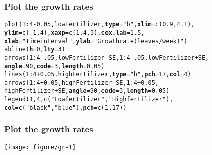 \documentclass[color=usenames,dvipsnames]{beamer}\usepackage[]{graphicx}\usepackage[]{color}
\makeatletter
\newcommand{\hlnum}[1]{\textcolor[rgb]{0.69,0.494,0}{#1}}%
\newcommand{\hlstr}[1]{\textcolor[rgb]{0.749,0.012,0.012}{#1}}%
\newcommand{\hlopt}[1]{\textcolor[rgb]{0,0,0}{#1}}%
\newcommand{\hlstd}[1]{\textcolor[rgb]{0,0,0}{#1}}%
\newcommand{\hlkwc}[1]{\textcolor[rgb]{0,0,0}{\textbf{#1}}}%
\newcommand{\hlkwd}[1]{\textcolor[rgb]{0.004,0.004,0.506}{#1}}%
\newenvironment{kframe}{%
 \def\at@end@of@kframe{}%
 \ifinner\ifhmode%
  \def\at@end@of@kframe{\end{minipage}}%
  \begin{minipage}{\columnwidth}%
 \fi\fi%
 \def\FrameCommand##1{\hskip\@totalleftmargin \hskip-\fboxsep
 \colorbox{shadecolor}{##1}\hskip-\fboxsep
     \hskip-\linewidth \hskip-\@totalleftmargin \hskip\columnwidth}%
 \MakeFramed {\advance\hsize-\width
   \@totalleftmargin\z@ \linewidth\hsize
   \@setminipage}}%
 {\par\unskip\endMakeFramed%
 \at@end@of@kframe}
\newenvironment{knitrout}{}{} %
\makeatother
\begin{document}
\begin{frame}[fragile]
  \frametitle{Plot the growth rates}
\begin{knitrout}\small
{}\color{fgcolor}\begin{kframe}
\begin{alltt}
\hlkwd{plot}\hlstd{(}\hlnum{1}\hlopt{:}\hlnum{4}\hlopt{-}\hlnum{0.05}\hlstd{, lowFertilizer,} \hlkwc{type}\hlstd{=}\hlstr{"b"}\hlstd{,} \hlkwc{xlim}\hlstd{=}\hlkwd{c}\hlstd{(}\hlnum{0.9}\hlstd{,} \hlnum{4.1}\hlstd{),}
     \hlkwc{ylim}\hlstd{=}\hlkwd{c}\hlstd{(}\hlopt{-}\hlnum{1}\hlstd{,} \hlnum{4}\hlstd{),} \hlkwc{xaxp}\hlstd{=}\hlkwd{c}\hlstd{(}\hlnum{1}\hlstd{,}\hlnum{4}\hlstd{,}\hlnum{3}\hlstd{),} \hlkwc{cex.lab}\hlstd{=}\hlnum{1.5}\hlstd{,}
     \hlkwc{xlab}\hlstd{=}\hlstr{"Time interval"}\hlstd{,} \hlkwc{ylab}\hlstd{=}\hlstr{"Growth rate (leaves/week)"}\hlstd{)}
\hlkwd{abline}\hlstd{(}\hlkwc{h}\hlstd{=}\hlnum{0}\hlstd{,} \hlkwc{lty}\hlstd{=}\hlnum{3}\hlstd{)}
\hlkwd{arrows}\hlstd{(}\hlnum{1}\hlopt{:}\hlnum{4}\hlopt{-}\hlnum{.05}\hlstd{, lowFertilizer}\hlopt{-}\hlstd{SE,} \hlnum{1}\hlopt{:}\hlnum{4}\hlopt{-}\hlnum{.05}\hlstd{, lowFertilizer}\hlopt{+}\hlstd{SE,}
       \hlkwc{angle}\hlstd{=}\hlnum{90}\hlstd{,} \hlkwc{code}\hlstd{=}\hlnum{3}\hlstd{,} \hlkwc{length}\hlstd{=}\hlnum{0.05}\hlstd{)}
\hlkwd{lines}\hlstd{(}\hlnum{1}\hlopt{:}\hlnum{4}\hlopt{+}\hlnum{0.05}\hlstd{, highFertilizer,} \hlkwc{type}\hlstd{=}\hlstr{"b"}\hlstd{,} \hlkwc{pch}\hlstd{=}\hlnum{17}\hlstd{,} \hlkwc{col}\hlstd{=}\hlnum{4}\hlstd{)}
\hlkwd{arrows}\hlstd{(}\hlnum{1}\hlopt{:}\hlnum{4}\hlopt{+}\hlnum{0.05}\hlstd{, highFertilizer}\hlopt{-}\hlstd{SE,} \hlnum{1}\hlopt{:}\hlnum{4}\hlopt{+}\hlnum{0.05}\hlstd{,}
       \hlstd{highFertilizer}\hlopt{+}\hlstd{SE,} \hlkwc{angle}\hlstd{=}\hlnum{90}\hlstd{,} \hlkwc{code}\hlstd{=}\hlnum{3}\hlstd{,} \hlkwc{length}\hlstd{=}\hlnum{0.05}\hlstd{)}
\hlkwd{legend}\hlstd{(}\hlnum{1}\hlstd{,} \hlnum{4}\hlstd{,} \hlkwd{c}\hlstd{(}\hlstr{"Low fertilizer"}\hlstd{,} \hlstr{"High fertilizer"}\hlstd{),}
       \hlkwc{col}\hlstd{=}\hlkwd{c}\hlstd{(}\hlstr{"black"}\hlstd{,} \hlstr{"blue"}\hlstd{),} \hlkwc{pch}\hlstd{=}\hlkwd{c}\hlstd{(}\hlnum{1}\hlstd{,}\hlnum{17}\hlstd{))}
\end{alltt}
\end{kframe}
\end{knitrout}
\end{frame}






\begin{frame}[fragile]
  \frametitle{Plot the growth rates}
  \tiny
  \centering
    \texttt{[image: figure/gr-1]} \\
\end{frame}
\end{document}
